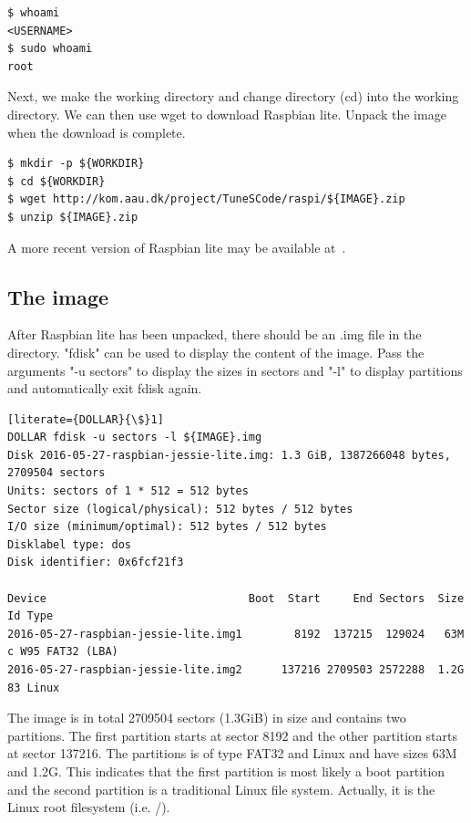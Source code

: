 \begin{lstlisting}[]
$ whoami
<USERNAME>
$ sudo whoami
root
\end{lstlisting}
\FloatBarrier
\vspace{-5mm}

Next, we make the working directory and change directory (cd) into the working
directory. We can then use wget to download Raspbian lite. Unpack the image
when the download is complete.

\begin{lstlisting}[]
$ mkdir -p ${WORKDIR}
$ cd ${WORKDIR}
$ wget http://kom.aau.dk/project/TuneSCode/raspi/${IMAGE}.zip
$ unzip ${IMAGE}.zip
\end{lstlisting}
\FloatBarrier
\vspace{-5mm}

A more recent version of Raspbian lite may be available at~\cite{raspbian}.

\subsection{The image}

After Raspbian lite has been unpacked, there should be an .img file in the directory.
"fdisk" can be used to display the content of the image. Pass the arguments "-u sectors" to
display the sizes in sectors and "-l" to display partitions and automatically
exit fdisk again.

\begin{lstlisting}[literate={DOLLAR}{\$}1]
DOLLAR fdisk -u sectors -l ${IMAGE}.img
Disk 2016-05-27-raspbian-jessie-lite.img: 1.3 GiB, 1387266048 bytes, 2709504 sectors
Units: sectors of 1 * 512 = 512 bytes
Sector size (logical/physical): 512 bytes / 512 bytes
I/O size (minimum/optimal): 512 bytes / 512 bytes
Disklabel type: dos
Disk identifier: 0x6fcf21f3

Device                               Boot  Start     End Sectors  Size Id Type
2016-05-27-raspbian-jessie-lite.img1        8192  137215  129024   63M  c W95 FAT32 (LBA)
2016-05-27-raspbian-jessie-lite.img2      137216 2709503 2572288  1.2G 83 Linux
\end{lstlisting}
\FloatBarrier

The image is in total 2709504 sectors (1.3GiB) in size and contains two
partitions. The first partition starts at sector 8192 and
the other partition starts at sector 137216. The partitions is of type FAT32
and Linux and have sizes 63M and 1.2G. This indicates that the first partition
is most likely a boot partition and the second partition is a traditional Linux file
system. Actually, it is the Linux root filesystem (i.e. /).

